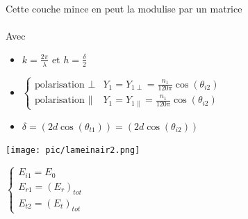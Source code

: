 \documentclass[12pt]{book}
\begin{document}
            \begin{center}
                \begin{minipage}{0.64\linewidth}
                    Cette couche mince en peut la modulise par un matrice \\
                    \\
                    Avec \begin{itemize}
                        \item $ k=\frac{2\pi}{\lambda} \text{ et } h = \frac{\delta}{2}$\\
                        \item $\begin{cases}
                            \text{polarisation $\perp$} & Y_1 = Y_{1\perp}=\frac{n_1}{120\pi}\cos(\theta_{i2})\\
                            \text{polarisation $\parallel$} & Y_1 = Y_{1\parallel}=\frac{n_1}{120\pi}\cos(\theta_{i2})
                            \end{cases}$
                        \item $\delta = (2d\cos(\theta_{t1}))=(2d\cos(\theta_{i2}))$
                    \end{itemize}
                    
                \end{minipage}
                \begin{minipage}{0.35\linewidth}
                    \texttt{[image: pic/lameinair2.png]}\\
                    \begin{center}
                        $\begin{cases}
                            E_{i1} = E_0 \\
                            E_{r1}=(E_r)_{tot} \\
                            E_{t2}=(E_t)_{tot}
                        \end{cases}$
                    \end{center}
                \end{minipage} 
            \end{center}
\end{document}
